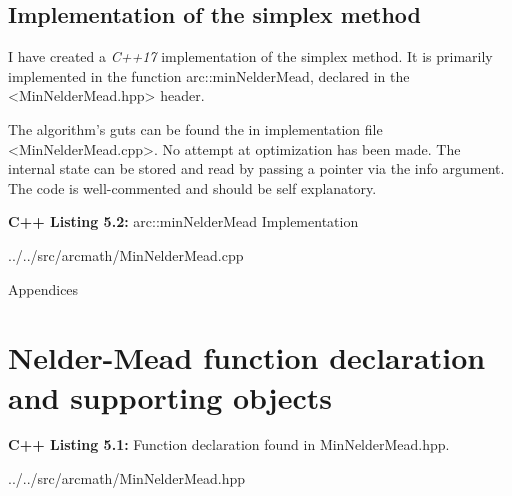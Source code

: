 \documentclass[11pt,oneside]{extarticle}
\begin{document}
\subsection{Implementation of the simplex method}

\par I have created a \emph{C++17} implementation of the simplex method. It is
primarily implemented in the function {\ttfamily arc::minNelderMead}, declared in
the {\ttfamily <MinNelderMead.hpp>} header.


\par The algorithm's guts can be found the in implementation file
{\ttfamily <MinNelderMead.cpp>}. No attempt at optimization has been made. The 
internal state can be stored and read by passing a pointer via the {\ttfamily info} 
argument. The code is well-commented and should be self explanatory.

\vskip 50pt

\begingroup
{}\selectfont
\lstset{language=c++,
    showstringspaces=false
    basicstyle=\scriptsize,
}

\begin{center}
    {\bf C++ Listing 5.2:} {\ttfamily arc::minNelderMead} Implementation
\end{center}

{\scriptsize

{../../src/arcmath/MinNelderMead.cpp}
}
\endgroup

\newpage

\appendix

\begin{center}
{\Huge Appendices}
\end{center}

\section{Nelder-Mead function declaration and supporting objects}

\vskip 20pt

\begingroup
{}\selectfont
\lstset{language=c++,
    showstringspaces=false
    basicstyle=\scriptsize,
}

\begin{center}
    {\bf C++ Listing 5.1:} Function declaration found in 
    {\ttfamily MinNelderMead.hpp}.
\end{center}

{\scriptsize

{../../src/arcmath/MinNelderMead.hpp}
}
\endgroup

\vskip 40pt
\end{document}
